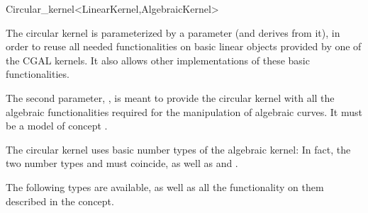 \begin{ccRefClass}{Circular_kernel<LinearKernel,AlgebraicKernel>}

\ccDefinition


\ccIsModel


\ccParameters

The circular kernel is parameterized by a  parameter
(and derives from it), in order to reuse all needed functionalities on
basic linear objects provided by one of the CGAL kernels. It also
allows other implementations of these basic functionalities.

The second parameter, , is meant to provide the
circular kernel with all the algebraic functionalities required for the
manipulation of algebraic curves. 
It must be a model of concept . 

\ccInheritsFrom


\ccTypes

\ccThreeToTwo

The circular kernel uses basic number types of the algebraic kernel:
In fact, the two number types  and
 must coincide, as well as
 and .

The following types are available, as well as all the functionality on
them described in the  concept. 

\ccGlue
{}
\ccGlue
{}

\ccSeeAlso

\\

\end{ccRefClass}
